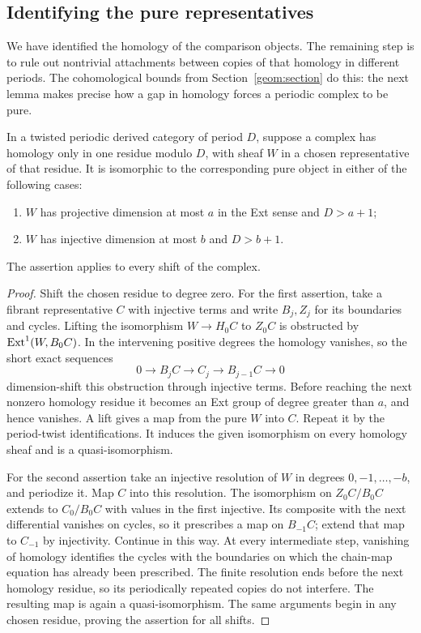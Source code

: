 \subsection{Identifying the pure representatives}

We have identified the homology of the comparison objects. The
remaining step is to rule out nontrivial attachments between copies
of that homology in different periods. The cohomological bounds from
Section~\ref{geom:section} do this: the next lemma makes precise how a
gap in homology forces a periodic complex to be pure.

\begin{lemma}
\label{comp:sparse}
In a twisted periodic derived category of period $D$, suppose a complex
has homology only in one residue modulo $D$, with sheaf $W$ in a
chosen representative of that residue. It is isomorphic to the
corresponding pure object in either of the following cases:
\begin{enumerate}
\item $W$ has projective dimension at most $a$ in the Ext sense and
      $D>a+1$;
\item $W$ has injective dimension at most $b$ and $D>b+1$.
\end{enumerate}
The assertion applies to every shift of the complex.
\end{lemma}

\begin{proof}
Shift the chosen residue to degree zero. For the first assertion, take
a fibrant representative $C$ with injective terms and write $B_j,Z_j$
for its boundaries and cycles. Lifting the isomorphism
$W\to H_0C$ to $Z_0C$ is obstructed by
$\operatorname{Ext}^1(W,B_0C)$. In the intervening positive degrees the homology
vanishes, so the short exact sequences
\[
 0\longrightarrow B_jC\longrightarrow C_j
       \longrightarrow B_{j-1}C\longrightarrow0
\]
dimension-shift this obstruction through injective terms. Before
reaching the next nonzero homology residue it becomes an Ext group
of degree greater than $a$, and hence vanishes. A lift gives a map
from the pure $W$ into $C$. Repeat it by the period-twist
identifications. It induces the given isomorphism on every homology
sheaf and is a quasi-isomorphism.

For the second assertion take an injective resolution of $W$ in
degrees $0,-1,\ldots,-b$, and periodize it. Map $C$ into this
resolution. The isomorphism on $Z_0C/B_0C$ extends to $C_0/B_0C$
with values in the first injective. Its composite with the next
differential vanishes on cycles, so it prescribes a map on $B_{-1}C$;
extend that map to $C_{-1}$ by injectivity. Continue in this way.
At every intermediate step, vanishing of homology identifies the
cycles with the boundaries on which the chain-map equation has
already been prescribed. The finite resolution ends before the next
homology residue, so its periodically repeated copies do not
interfere. The resulting map is again a quasi-isomorphism. The same
arguments begin in any chosen residue, proving the assertion for all
shifts.
\end{proof}

